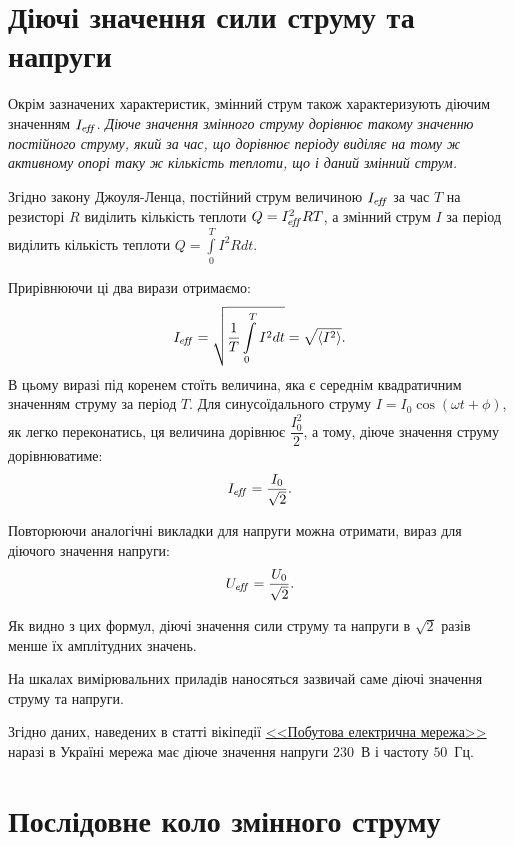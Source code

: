 \section{Діючі значення сили струму та напруги}

Окрім зазначених характеристик, змінний струм також характеризують діючим значенням $I_{e\kern-.3ex f\kern-.5ex f}$. \emph{Діюче значення змінного струму дорівнює такому значенню постійного струму, який за час, що дорівнює періоду виділяє на тому ж активному опорі таку ж кількість теплоти, що і даний змінний струм.}

Згідно закону Джоуля-Ленца, постійний струм величиною $I_{e\kern-.3ex f\kern-.5ex f}$  за час $T$ на резисторі $R$ виділить кількість теплоти $Q  = I_{e\kern-.3ex f\kern-.5ex f}^2 R T$, а змінний струм $I$ за період виділить кількість теплоти $Q = \int\limits_0^T I^2 R dt$.

Прирівнюючи ці два вирази отримаємо:
\[
	I_{e\kern-.3ex f\kern-.5ex f} = \sqrt{\frac1T\int\limits_0^T I^2 dt} = \sqrt{\left\langle I^2\right\rangle }.
\]
В цьому виразі під коренем стоїть величина, яка є середнім квадратичним значенням струму за період $T$. Для синусоїдального струму $I = I_0\cos(\omega t + \phi)$, як легко переконатись, ця величина дорівнює $\dfrac{I_0^2}{2}$, а тому, діюче значення струму дорівнюватиме:
\begin{equation}\label{Ieff}
	I_{e\kern-.3ex f\kern-.5ex f} = \frac{I_0}{\sqrt2}.
\end{equation}

Повторюючи аналогічні викладки для напруги можна отримати, вираз для діючого значення напруги:
\begin{equation}\label{Ueff}
	U_{e\kern-.3ex f\kern-.5ex f} = \frac{U_0}{\sqrt2}.
\end{equation}

Як видно з цих формул, діючі значення сили струму та напруги в $\sqrt2$ разів менше їх амплітудних значень.

\noindent\bigskip%
\begin{More}

	На шкалах вимірювальних приладів наносяться зазвичай саме діючі значення струму та напруги.

	Згідно даних, наведених в статті вікіпедії \href{https://uk.wikipedia.org/wiki/Побутова_електрична_мережа}{<<Побутова електрична мережа>>} наразі в Україні мережа має діюче значення напруги $230$~В  і частоту $50$~Гц.
\end{More}

\section{Послідовне коло змінного струму}

